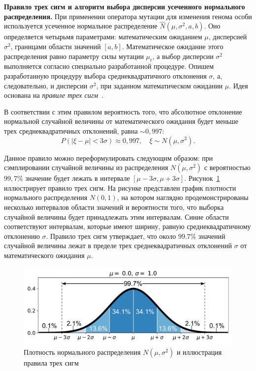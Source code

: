 \FloatBarrier
\textbf{Правило трех сигм и алгоритм выбора дисперсии усеченного нормального распределения.}
При применении оператора мутации для изменения генома особи используется усеченное нормальное распределение $\hat{N}(\mu, \sigma^2, a, b)$.
Оно определяется четырьмя параметрами: математическим ожиданием $\mu$, дисперсией $\sigma^2$, границами области значений $[a, b]$.
Математическое ожидание этого распределения равно параметру силы мутации $\mu_\text{r}$, а выбор дисперсии $\sigma^2$ выполняется согласно специально разработанной процедуре.
Опишем разработанную процедуру выбора среднеквадратичного отклонения $\sigma$, а, следовательно, и дисперсии $\sigma^2$, при заданном математическом ожидании $\mu$.
Идея основана на \textit{правиле трех сигм}~\cite{pukelsheim1994three}.

В соответствии с этим правилом вероятность того, что абсолютное отклонение нормальной случайной величины от математического ожидания будет меньше трех среднеквадратичных отклонений, равна $\sim{0{,}997}$:
$$P(|\xi - \mu| < 3\sigma) 	\approx 0{,}997,\quad \xi \sim N(\mu, \sigma^2).$$

Данное правило можно переформулировать следующим образом: при сэмплировании случайной величины из распределения $N(\mu, \sigma^2)$ с вероятностью $99{,}7$\% значение будет лежать в интервале $[\mu - 3\sigma, \mu + 3 \sigma]$.
Рисунок~\ref{fig:part2:3sigma_rule} иллюстрирует правило трех сигм.
На рисунке представлен график плотности нормального распределения $N(0, 1)$, на котором наглядно продемонстрированы несколько интервалов области значений и вероятности того, что выборка случайной величины будет принадлежать этим интервалам.
Синие области соответствуют интервалам, которые имеют ширину, равную среднеквадратичному отклонению $\sigma$.
Правило трех сигм утверждает, что около $99{.}7$\% значений случайной величины лежат в пределе трех среднеквадратичных отклонений $\sigma$ от математического ожидания $\mu$.

\begin{figure}[ht]
    \centering
    \includegraphics[width=0.8\linewidth]{images/part2/genetics_algorithm/3sigma_rule_fixed.pdf}
    \caption{Плотность нормального распределения $N(\mu, \sigma^2)$ и иллюстрация правила трех сигм}
    \label{fig:part2:3sigma_rule}
\end{figure}

